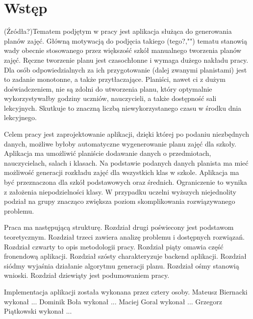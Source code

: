 
\chapter{Wstęp}
(Źródła?)Tematem podjętym w pracy jest aplikacja służąca do generowania planów zajęć. Główną motywacją do podjęcia takiego (tego?,"") tematu stanowią wady obecnie stosowanego przez większość szkół manualnego tworzenia planów zajęć. Ręczne tworzenie planu jest czasochłonne i wymaga dużego nakładu pracy. Dla osób odpowiedzialnych za ich przygotowanie (dalej zwanymi planistami) jest to zadanie monotonne, a także przytłaczające. Planiści, nawet ci z dużym doświadczeniem, nie są zdolni do utworzenia planu, który optymalnie wykorzystywałby godziny uczniów, nauczycieli, a także dostępność sali lekcyjnych. Skutkuje to znaczną liczbą niewykorzystanego czasu w środku dnia lekcyjnego.

Celem pracy jest zaprojektowanie aplikacji, dzięki której po podaniu niezbędnych danych, możliwe byłoby automatyczne wygenerowanie planu zajęć dla szkoły. Aplikacja ma umożliwić planiście dodawanie danych o przedmiotach, nauczycielach, salach i klasach. Na podstawie podanych danych planista ma mieć możliwość generacji rozkładu zajęć dla wszystkich klas w szkole. Aplikacja ma być przeznaczona dla szkół podstawowych oraz średnich. Ograniczenie to wynika z założenia niepodzielności klasy. W przypadku uczelni wyższych niejednolity podział na grupy znacząco zwiększa poziom skomplikowania rozwiązywanego problemu.

Praca ma następującą strukturę. Rozdział drugi poświecony jest podstawom teoretycznym. Rozdział trzeci zawiera analizę problemu i dostępnych rozwiązań. Rozdział czwarty to opis metodologii pracy. Rozdział piąty omawia część fronendową aplikacji. Rozdział szósty charakteryzuje backend aplikacji. Rozdział siódmy wyjaśnia działanie algorytmu generacji planu. Rozdział ośmy stanowią wnioski. Rozdział dziewiąty jest podumowaniem pracy. 

Implementacja aplikacji została wykonana przez cztery osoby.
Mateusz Biernacki wykonał ...
Dominik Boła wykonał ...
Maciej Goral wykonał ...
Grzegorz Piątkowski wykonał ...

